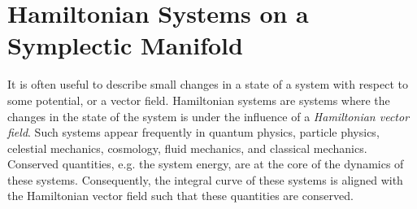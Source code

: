 %

 

\section{Hamiltonian Systems on a Symplectic Manifold} \label{section:2.3}
It is often useful to describe small changes in a state of a system with respect to some potential, or a vector field. Hamiltonian systems are systems where the changes in the state of the system is under the influence of a \emph{Hamiltonian vector field}. Such systems appear frequently in quantum physics, particle physics, celestial mechanics, cosmology, fluid mechanics, and classical mechanics. Conserved quantities, e.g. the system energy, are at the core of the dynamics of these systems. Consequently, the integral curve of these systems is aligned with the Hamiltonian vector field such that these quantities are conserved.

